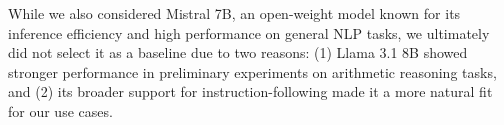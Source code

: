 While we also considered Mistral 7B, an open-weight model known for its inference efficiency and high performance on general NLP tasks, we ultimately did not select it as a baseline due to two reasons: (1) Llama 3.1 8B showed stronger performance in preliminary experiments on arithmetic reasoning tasks, and (2) its broader support for instruction-following made it a more natural fit for our use cases.
